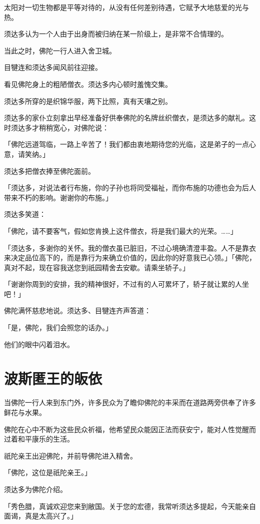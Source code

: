 \documentclass[twoside,openany]{book}
\begin{document}
太阳对一切生物都是平等对待的，从没有任何差别待遇，它赋予大地慈爱的光与热。

须达多认为一个人由于出身而被归纳在某一阶级上，是非常不合情理的。

当此之时，佛陀一行人进入舍卫城。

目犍连和须达多闻风前往迎接。

看见佛陀身上的粗陋僧衣。须达多内心顿时羞愧交集。

须达多所穿的是织锦华服，两下比照，真有天壤之别。

须达多的家仆立刻拿出早经准备好供奉佛陀的名牌丝织僧衣，是须达多的献礼。这时须达多才稍稍宽心，对佛陀说：

「佛陀远道驾临，一路上辛苦了！我们都由衷地期待您的光临，这是弟子的一点心意，请笑纳。」

须达多把僧衣捧至佛陀面前。

「须达多，对说法者行布施，你的子孙也将同受福祉，而你布施的功德也会为后人带来不朽的影响。谢谢你的布施。」

须达多笑道：

「佛陀，请不要客气，假如您肯换上这件僧衣，将是我们最大的光荣。……」

「须达多，多谢你的关怀。我的僧衣虽已脏旧，不过心境确清澄丰盈。人不是靠衣来决定品位高下的，而是靠行为来确立价值的，因此你的好意我已心领。」「佛陀，真对不起，现在容我送您到祇园精舍去安歇。请乘坐轿子。」

「谢谢你周到的安排，我的精神很好，不过有的人可累坏了，轿子就让累的人坐吧！」

佛陀满怀慈悲地说。须达多、目犍连齐声答道：

「是，佛陀，我们会照您的话办。」

他们的眼中闪着泪水。

\section{波斯匿王的皈依}\label{sec6.6}

当佛陀一行人来到东门外，许多民众为了瞻仰佛陀的丰采而在道路两旁供奉了许多鲜花与水果。

佛陀在心中不断为这些民众祈福，他希望民众能因正法而获安宁，能对人性觉醒而过着和平康乐的生活。

祇陀亲王出迎佛陀，并前导佛陀进入精舍。

「佛陀，这位是祇陀亲王。」

须达多为佛陀介绍。

「秀色腊，真诚欢迎您来到敝国。关于您的宏德，我常听须达多提起，今天能亲自面谒，真是太高兴了。」
\end{document}
